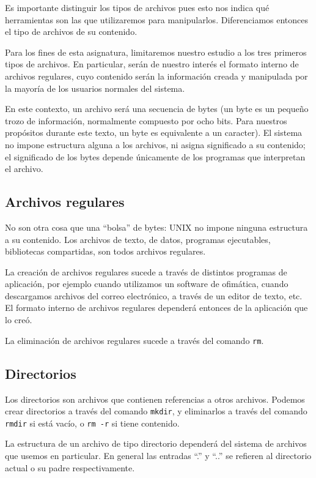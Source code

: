 \documentclass[12pt]{article}
\begin{document}
Es importante distinguir los tipos de archivos pues esto nos indica qué 
herramientas son las que utilizaremos para manipularlos. Diferenciamos 
entonces el tipo de archivos de su contenido.   

Para los fines de esta asignatura, limitaremos nuestro estudio a los tres 
primeros tipos de archivos. En particular, serán de nuestro interés el 
formato interno de archivos regulares, cuyo contenido serán la información 
creada y manipulada por la mayoría de los usuarios normales del sistema.  

En este contexto, un archivo será una secuencia de bytes (un byte es un 
pequeño trozo de información, normalmente compuesto por ocho bits. Para 
nuestros propósitos durante este texto, un byte es equivalente a un 
caracter). El sistema no impone estructura alguna a los archivos, ni 
asigna significado a su contenido; el significado de los bytes depende 
únicamente de los programas que interpretan el archivo. 

\subsection*{Archivos regulares}
No son otra cosa que una ``bolsa'' de bytes: UNIX no impone ninguna estructura 
a su contenido. Los archivos de texto, de datos, programas ejecutables, 
bibliotecas compartidas, son todos archivos regulares.

La creación de archivos regulares sucede a través de distintos programas de 
aplicación, por ejemplo cuando utilizamos un software de ofimática, cuando 
descargamos archivos del correo electrónico, a través de un editor de texto, 
etc. El formato 
interno de archivos regulares dependerá entonces de la aplicación que lo creó. 

La eliminación de archivos regulares sucede a través del comando \texttt{rm}. 

\subsection*{Directorios}
Los directorios son archivos que contienen referencias a otros archivos. 
Podemos crear directorios a través del comando \texttt{mkdir}, y eliminarlos
a través del comando \texttt{rmdir} si está vacío, o \texttt{rm -r} si tiene 
contenido. 

La estructura de un archivo de tipo directorio dependerá del sistema de 
archivos que usemos en particular. En general las entradas ``.'' y ``..''
se refieren al directorio actual o su padre respectivamente.  
\end{document}
